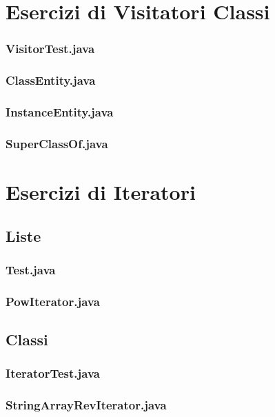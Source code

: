 \documentclass[10pt]{article}
\begin{document}
\section{Esercizi di Visitatori Classi}
        \subsubsection{VisitorTest.java}
            
        \subsubsection{ClassEntity.java}
            
        \subsubsection{InstanceEntity.java}
            
        \subsubsection{SuperClassOf.java}
            
\section{Esercizi di Iteratori}
        \subsection{Liste}
            \subsubsection{Test.java}
                
            \subsubsection{PowIterator.java}
                

        \subsection{Classi}
            \subsubsection{IteratorTest.java}
                
            \subsubsection{StringArrayRevIterator.java}
                
\end{document}
